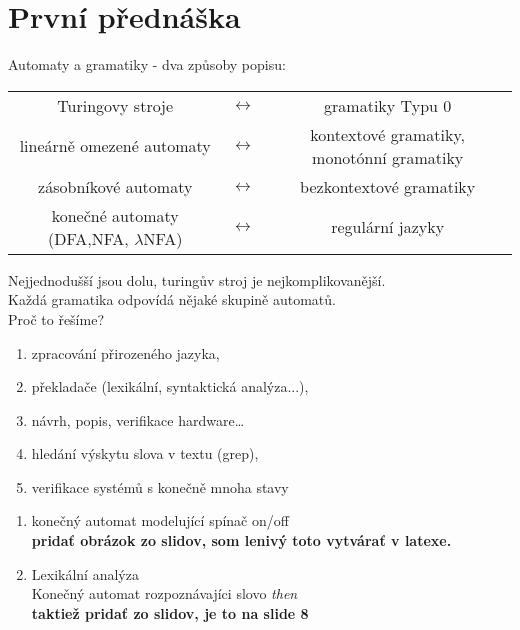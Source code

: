 \documentclass[../main.tex]{subfiles}
\begin{document}
\section{První přednáška}

\begin{intuition}
    Automaty a gramatiky - dva způsoby popisu:\\

    
    \begin{tabular} {c c c}
        Turingovy stroje & $\leftrightarrow$ & gramatiky Typu 0\\
        lineárně omezené automaty & $\leftrightarrow$ & kontextové gramatiky, monotónní gramatiky\\
        zásobníkové automaty & $\leftrightarrow$ & bezkontextové gramatiky\\
        konečné automaty (DFA,NFA, $\lambda$NFA) & $\leftrightarrow$ & regulární jazyky\\
    \end{tabular}

    \begin{remark}
        Nejjednodušší jsou dolu, turingův stroj je nejkomplikovanější.\\
        Každá gramatika odpovídá nějaké skupině automatů.\\

        Proč to řešíme?
        \begin{enumerate}
            \item zpracování přirozeného jazyka,
            \item překladače (lexikální, syntaktická analýza...),
            \item návrh, popis, verifikace hardware\dots
            \item hledání výskytu slova v textu (grep),
            \item verifikace systémů s konečně mnoha stavy
        \end{enumerate}
    \end{remark}


\end{intuition}

\begin{example}

    \begin{enumerate}
     \item konečný automat modelující spínač on/off\\
    \textbf{pridať obrázok zo slidov, som lenivý toto vytvárať v latexe.}\\
    \item Lexikální analýza\\
    Konečný automat rozpoznávajíci slovo \textit{then}\\
    \textbf{taktiež pridať zo slidov, je to na slide 8}
    \end{enumerate}
\end{example}
\end{document}
